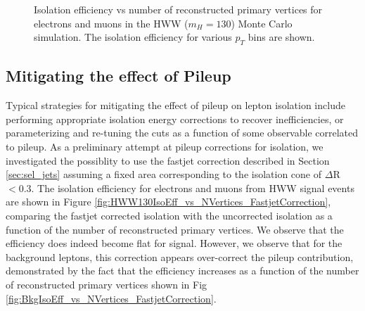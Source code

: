 \begin{figure}[!htbp]
\begin{center}
\caption{Isolation efficiency vs number of reconstructed primary vertices for electrons and muons
in the HWW ($m_{H} = 130$) Monte Carlo simulation. The isolation efficiency for various $p_{T}$ 
bins are shown.}
\label{fig:HWW130IsoEff_vs_NVertices}
\end{center}
\end{figure}





\subsection{Mitigating the effect of Pileup}

Typical strategies for mitigating the effect of pileup on lepton isolation include
performing appropriate isolation energy corrections to recover inefficiencies, or 
parameterizing and re-tuning the cuts as a function of some observable correlated
to pileup. As a preliminary attempt at pileup corrections for isolation, we investigated
the possiblity to use the fastjet correction described in Section \ref{sec:sel_jets} 
assuming a fixed area corresponding to the isolation cone of $\Delta$R $< 0.3$. 
The isolation efficiency for electrons and muons from HWW signal events are shown in 
Figure \ref{fig:HWW130IsoEff_vs_NVertices_FastjetCorrection}, comparing
the fastjet corrected isolation with the uncorrected isolation as a function of the 
number of reconstructed primary vertices. We observe that the efficiency does indeed become 
flat for signal. However, we observe that for the background leptons, this correction appears
over-correct the pileup contribution, demonstrated by the fact that the efficiency increases
as a function of the number of reconstructed primary vertices shown in Fig 
\ref{fig:BkgIsoEff_vs_NVertices_FastjetCorrection}. 


